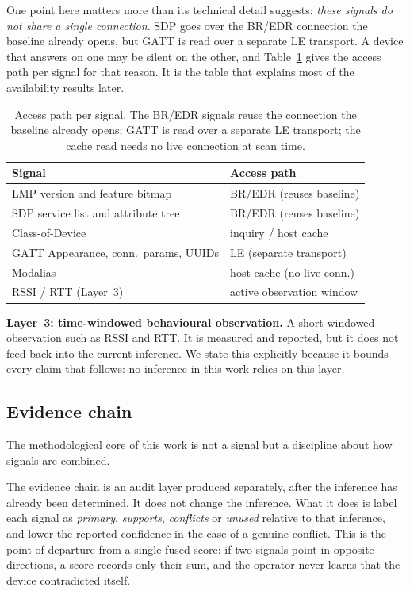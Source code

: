 \documentclass[conference]{IEEEtran}
\begin{document}
One point here matters more than its technical detail suggests: \emph{these
signals do not share a single connection}. SDP goes over the BR/EDR connection
the baseline already opens, but GATT is read over a separate LE transport. A
device that answers on one may be silent on the other, and
Table~\ref{tab:transport} gives the access path per signal for that reason. It
is the table that explains most of the availability results later.

\begin{table}[t]
\centering
\footnotesize
\renewcommand{\arraystretch}{1.15}
\caption{Access path per signal. The BR/EDR signals reuse the connection the
baseline already opens; GATT is read over a separate LE transport; the cache
read needs no live connection at scan time.}
\label{tab:transport}
\begin{tabular}{@{}ll@{}}
\toprule
\textbf{Signal} & \textbf{Access path} \\
\midrule
LMP version and feature bitmap & BR/EDR (reuses baseline) \\
SDP service list and attribute tree & BR/EDR (reuses baseline) \\
Class-of-Device & inquiry / host cache \\
GATT Appearance, conn.\ params, UUIDs & LE (separate transport) \\
Modalias & host cache (no live conn.) \\
RSSI / RTT (Layer~3) & active observation window \\
\bottomrule
\end{tabular}
\end{table}

\textbf{Layer~3: time-windowed behavioural observation.} A short windowed
observation such as RSSI and RTT. It is measured and reported, but it does not
feed back into the current inference. We state this explicitly because it
bounds every claim that follows: no inference in this work relies on this
layer.

\subsection{Evidence chain}\label{sec:evidence}
The methodological core of this work is not a signal but a discipline about
how signals are combined.

The evidence chain is an audit layer produced separately, after the inference
has already been determined. It does not change the inference. What it does is
label each signal as \emph{primary}, \emph{supports}, \emph{conflicts} or
\emph{unused} relative to that inference, and lower the reported confidence in
the case of a genuine conflict. This is the point of departure from a single
fused score: if two signals point in opposite directions, a score records only
their sum, and the operator never learns that the device contradicted itself.
\end{document}
